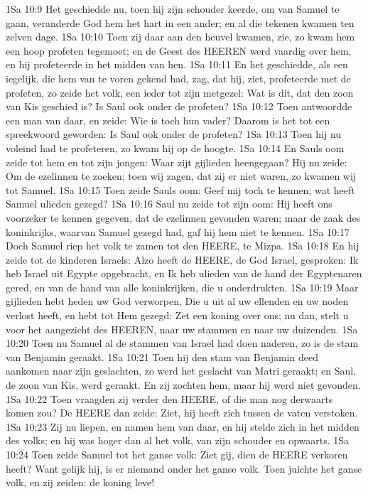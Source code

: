 1Sa 10:9  Het geschiedde nu, toen hij zijn schouder keerde, om van Samuel te gaan, veranderde God hem het hart in een ander; en al die tekenen kwamen ten zelven dage.
1Sa 10:10  Toen zij daar aan den heuvel kwamen, zie, zo kwam hem een hoop profeten tegemoet; en de Geest des HEEREN werd vaardig over hem, en hij profeteerde in het midden van hen.
1Sa 10:11  En het geschiedde, als een iegelijk, die hem van te voren gekend had, zag, dat hij, ziet, profeteerde met de profeten, zo zeide het volk, een ieder tot zijn metgezel: Wat is dit, dat den zoon van Kis geschied is? Is Saul ook onder de profeten?
1Sa 10:12  Toen antwoordde een man van daar, en zeide: Wie is toch hun vader? Daarom is het tot een spreekwoord geworden: Is Saul ook onder de profeten?
1Sa 10:13  Toen hij nu voleind had te profeteren, zo kwam hij op de hoogte.
1Sa 10:14  En Sauls oom zeide tot hem en tot zijn jongen: Waar zijt gijlieden heengegaan? Hij nu zeide: Om de ezelinnen te zoeken; toen wij zagen, dat zij er niet waren, zo kwamen wij tot Samuel.
1Sa 10:15  Toen zeide Sauls oom: Geef mij toch te kennen, wat heeft Samuel ulieden gezegd?
1Sa 10:16  Saul nu zeide tot zijn oom: Hij heeft ons voorzeker te kennen gegeven, dat de ezelinnen gevonden waren; maar de zaak des koninkrijks, waarvan Samuel gezegd had, gaf hij hem niet te kennen.
1Sa 10:17  Doch Samuel riep het volk te zamen tot den HEERE, te Mizpa.
1Sa 10:18  En hij zeide tot de kinderen Israels: Alzo heeft de HEERE, de God Israel, gesproken: Ik heb Israel uit Egypte opgebracht, en Ik heb ulieden van de hand der Egyptenaren gered, en van de hand van alle koninkrijken, die u onderdrukten.
1Sa 10:19  Maar gijlieden hebt heden uw God verworpen, Die u uit al uw ellenden en uw noden verlost heeft, en hebt tot Hem gezegd: Zet een koning over ons; nu dan, stelt u voor het aangezicht des HEEREN, naar uw stammen en naar uw duizenden.
1Sa 10:20  Toen nu Samuel al de stammen van Israel had doen naderen, zo is de stam van Benjamin geraakt.
1Sa 10:21  Toen hij den stam van Benjamin deed aankomen naar zijn geslachten, zo werd het geslacht van Matri geraakt; en Saul, de zoon van Kis, werd geraakt. En zij zochten hem, maar hij werd niet gevonden.
1Sa 10:22  Toen vraagden zij verder den HEERE, of die man nog derwaarts komen zou? De HEERE dan zeide: Ziet, hij heeft zich tussen de vaten verstoken.
1Sa 10:23  Zij nu liepen, en namen hem van daar, en hij stelde zich in het midden des volks; en hij was hoger dan al het volk, van zijn schouder en opwaarts.
1Sa 10:24  Toen zeide Samuel tot het ganse volk: Ziet gij, dien de HEERE verkoren heeft? Want gelijk hij, is er niemand onder het ganse volk. Toen juichte het ganse volk, en zij zeiden: de koning leve!
